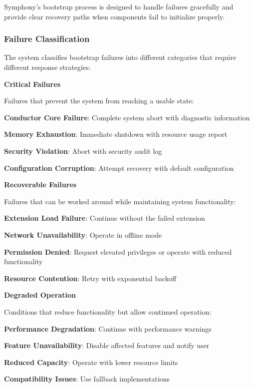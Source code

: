 Symphony's bootstrap process is designed to handle failures gracefully and provide clear recovery paths when components fail to initialize properly.

\subsubsection{Failure Classification}

The system classifies bootstrap failures into different categories that require different response strategies:

\textbf{Critical Failures}

Failures that prevent the system from reaching a usable state:

\begin{compactlist}
    \item \textbf{Conductor Core Failure}: Complete system abort with diagnostic information
    \item \textbf{Memory Exhaustion}: Immediate shutdown with resource usage report
    \item \textbf{Security Violation}: Abort with security audit log
    \item \textbf{Configuration Corruption}: Attempt recovery with default configuration
\end{compactlist}

\textbf{Recoverable Failures}

Failures that can be worked around while maintaining system functionality:

\begin{compactlist}
    \item \textbf{Extension Load Failure}: Continue without the failed extension
    \item \textbf{Network Unavailability}: Operate in offline mode
    \item \textbf{Permission Denied}: Request elevated privileges or operate with reduced functionality
    \item \textbf{Resource Contention}: Retry with exponential backoff
\end{compactlist}

\textbf{Degraded Operation}

Conditions that reduce functionality but allow continued operation:

\begin{compactlist}
    \item \textbf{Performance Degradation}: Continue with performance warnings
    \item \textbf{Feature Unavailability}: Disable affected features and notify user
    \item \textbf{Reduced Capacity}: Operate with lower resource limits
    \item \textbf{Compatibility Issues}: Use fallback implementations
\end{compactlist}

